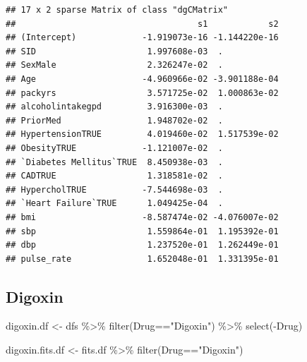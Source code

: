 \documentclass[
]{article}
\newenvironment{Shaded}{\begin{snugshade}}{\end{snugshade}}
\newcommand{\FloatTok}[1]{\textcolor[rgb]{0.00,0.00,0.81}{#1}}
\newcommand{\FunctionTok}[1]{\textcolor[rgb]{0.00,0.00,0.00}{#1}}
\newcommand{\NormalTok}[1]{#1}
\newcommand{\OtherTok}[1]{\textcolor[rgb]{0.56,0.35,0.01}{#1}}
\newcommand{\SpecialCharTok}[1]{\textcolor[rgb]{0.00,0.00,0.00}{#1}}
\newcommand{\StringTok}[1]{\textcolor[rgb]{0.31,0.60,0.02}{#1}}
\begin{document}
\begin{Shaded}
\end{Shaded}

\begin{verbatim}
## 17 x 2 sparse Matrix of class "dgCMatrix"
##                                    s1            s2
## (Intercept)             -1.919073e-16 -1.144220e-16
## SID                      1.997608e-03  .           
## SexMale                  2.326247e-02  .           
## Age                     -4.960966e-02 -3.901188e-04
## packyrs                  3.571725e-02  1.000863e-02
## alcoholintakegpd         3.916300e-03  .           
## PriorMed                 1.948702e-02  .           
## HypertensionTRUE         4.019460e-02  1.517539e-02
## ObesityTRUE             -1.121007e-02  .           
## `Diabetes Mellitus`TRUE  8.450938e-03  .           
## CADTRUE                  1.318581e-02  .           
## HypercholTRUE           -7.544698e-03  .           
## `Heart Failure`TRUE      1.049425e-04  .           
## bmi                     -8.587474e-02 -4.076007e-02
## sbp                      1.559864e-01  1.195392e-01
## dbp                      1.237520e-01  1.262449e-01
## pulse_rate               1.652048e-01  1.331395e-01
\end{verbatim}

\hypertarget{digoxin}{%
\subsection{Digoxin}\label{digoxin}}

\begin{Shaded}
\begin{Highlighting}[]
\NormalTok{digoxin.df }\OtherTok{\textless{}{-}}\NormalTok{ dfs }\SpecialCharTok{\%\textgreater{}\%} 
  \FunctionTok{filter}\NormalTok{(Drug}\SpecialCharTok{==}\StringTok{"Digoxin"}\NormalTok{) }\SpecialCharTok{\%\textgreater{}\%} 
  \FunctionTok{select}\NormalTok{(}\SpecialCharTok{{-}}\NormalTok{Drug)}
\end{Highlighting}
\end{Shaded}

\begin{Shaded}
\begin{Highlighting}[]
\NormalTok{digoxin.fits.df }\OtherTok{\textless{}{-}}\NormalTok{ fits.df }\SpecialCharTok{\%\textgreater{}\%} 
  \FunctionTok{filter}\NormalTok{(Drug}\SpecialCharTok{==}\StringTok{"Digoxin"}\NormalTok{)}
\end{Highlighting}
\end{Shaded}
\end{document}
